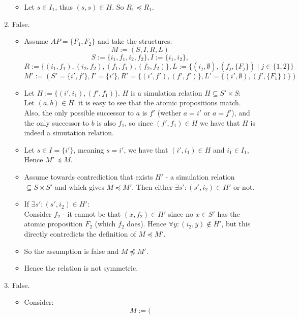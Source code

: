 \documentclass{article}
\begin{document}
\begin{enumerate}[label=\alph*.]
\begin{itemize}
        \item Let $s\in I_1$, thus $(s,s)\in H$. So $R_1\preceq R_1$.
    \end{itemize}
    \item False.
    \begin{itemize}
        \item 
        Assume $AP=\{F_1,F_2\}$ and 
        take the structures:
        \[
            M:=(S,I,R,L)
        \]
        \[
            S:=\{i_1,f_1, i_2, f_2\},
            I:=\{i_1,i_2\},
        \]\[
            R:=\{(i_1,f_1),(i_2,f_2), (f_1,f_1), (f_2,f_2)\},
            L:=\{(i_j, \emptyset), (f_j,\{F_j\})\mid j\in\{1,2\}\}    
        \]
        \[
            M':=(
                S'=\{i',f'\},
                I'=\{i'\},
                R'=\{(i',f'), (f',f')\},
                L'=\{(i', \emptyset), (f', \{F_1\})\}
            )
        \]
        \item Let $H:=\{(i',i_1), (f', f_1)\}$. $H$ is a simulation relation $H\subseteq S'\times S$:\\
        Let $(a,b)\in H$. it is easy to see that the atomic
        propositions match. Also, the only possible successor to $a$
        is $f'$ (wether $a=i'$ or $a=f'$), and the only successor to $b$
        is also $f_1$, so since $(f',f_1)\in H$ we have that $H$ is indeed a simutation relation.
        \item Let $s\in I=\{i'\}$, meaning $s=i'$,
        we have that $(i',i_1)\in H$ and $i_1\in I_1$, Hence $M'\preceq M$.
        \item Assume towards contrediction that exists $H'$ - a simulation relation $\subseteq S\times S'$ 
        and which gives $M\preceq M'$. Then either $\exists s':(s',i_2)\in H'$ or not.
        \item If $\exists s':(s',i_2)\in H'$:\\
        Consider $f_2$ - it cannot be that $(x,f_2)\in H'$ since no $x\in S'$
        has the atomic proposition $F_2$ (which $f_2$ does). Hence $\forall y:(i_2,y)\notin H'$,
        but this directly contredicts the definition of $M\preceq M'$.
        \item So the assumption is false and $M\not\preceq M'$.
        \item Hence the relation is not symmetric.
    \end{itemize}
    \item False.
    \begin{itemize}
        \item Consider:
        \[
            M:=(
\]
\end{itemize}
\end{enumerate}
\end{document}
